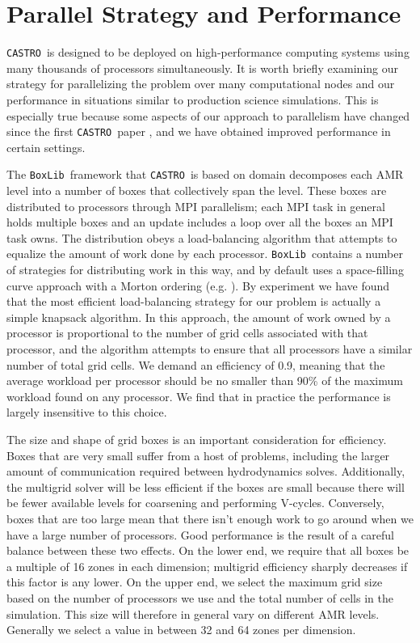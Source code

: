 \documentclass[iop]{../emulateapj}
\newcommand{\boxlib}{\texttt{BoxLib}}
\newcommand{\castro}{\texttt{CASTRO}}
\begin{document}
\section{Parallel Strategy and Performance}\label{sec:Performance}

\castro\ is designed to be deployed on high-performance computing systems using 
many thousands of processors simultaneously. It is worth briefly examining 
our strategy for parallelizing the problem over many computational nodes 
and our performance in situations similar to production science simulations. 
This is especially true because some aspects of our approach to parallelism 
have changed since the first \castro\ paper \citep{castro}, and we have obtained improved 
performance in certain settings.

The \boxlib\ framework that \castro\ is based on domain decomposes each AMR level into a number 
of boxes that collectively span the level. These boxes are distributed to processors 
through MPI parallelism; each MPI task in general holds multiple boxes and 
an update includes a loop over all the boxes an MPI task owns. The distribution 
obeys a load-balancing algorithm that attempts to equalize the amount of work 
done by each processor. \boxlib\ contains a number of strategies for distributing 
work in this way, and by default uses a space-filling curve approach with a 
Morton ordering (e.g. \cite{sasidharan:2015,beichl:1998}). By experiment we have found that the most efficient load-balancing 
strategy for our problem is actually a simple knapsack algorithm. In this approach, 
the amount of work owned by a processor is proportional to the number of grid cells 
associated with that processor, and the algorithm attempts to ensure that all 
processors have a similar number of total grid cells. We demand an efficiency of 0.9,
meaning that the average workload per processor should be no smaller than 90\% of the 
maximum workload found on any processor. We find that in practice the 
performance is largely insensitive to this choice.

The size and shape of grid boxes is an important consideration for efficiency. 
Boxes that are very small suffer from a host of problems, including the larger 
amount of communication required between hydrodynamics solves. Additionally, 
the multigrid solver will be less efficient if the boxes are small because there 
will be fewer available levels for coarsening and performing V-cycles. Conversely, 
boxes that are too large mean that there isn't enough work to go around when we 
have a large number of processors. Good performance is the result of a careful 
balance between these two effects. On the lower end, we require that all boxes 
be a multiple of 16 zones in each dimension; multigrid efficiency sharply decreases 
if this factor is any lower. On the upper end, we select the maximum grid size 
based on the number of processors we use and the total number of cells in the 
simulation. This size will therefore in general vary on different AMR levels. 
Generally we select a value in between 32 and 64 zones per dimension.
\end{document}

